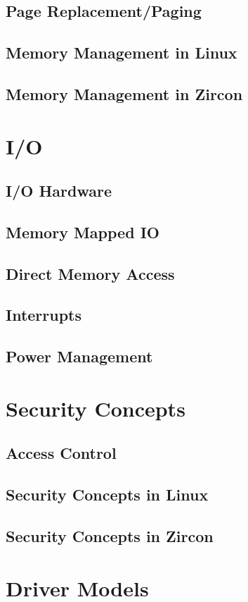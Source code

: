 \subsection{Page Replacement/Paging}
\subsection{Memory Management in Linux}
\subsection{Memory Management in Zircon}


\section{I/O} %
\subsection{I/O Hardware}
\subsection{Memory Mapped IO}
\subsection{Direct Memory Access}
\subsection{Interrupts}
\subsection{Power Management}

   
\section{Security Concepts} %
\subsection{Access Control} %
\subsection{Security Concepts in Linux}
\subsection{Security Concepts in Zircon}


\section{Driver Models} %
